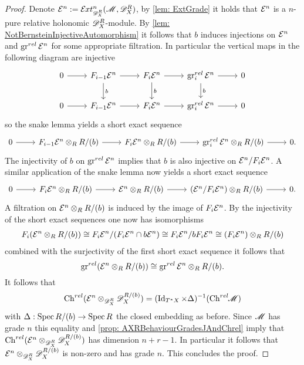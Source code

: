 \begin{proof}
  Denote $\E^n := \Ex{\D_X^R}{n}(\M,\D_X^R)$, by \cref{lem: ExtGrade} it holds that $\mathcal{E}^n$ is a $n$-pure relative holonomic $\mathscr{D}_X^R$-module.
  By \cref{lem: NotBernsteinInjectiveAutomorphism} it follows that $b$ induces injections on $\mathcal{E}^{n}$ and $\operatorname{gr}^{rel} \mathcal{E}^{n}$ for some appropriate filtration.
  In particular the vertical maps in the following diagram are injective
  $$\begin{tikzcd}
    0 \arrow{r} & F_{i-1} \E^n\arrow{r} \arrow{d}{b}& F_i \E^{n}\arrow{r} \arrow{d}{b}& \gr^{rel}_i \E^n\arrow{r}\arrow{d}{b} & 0\\
    0 \arrow{r} & F_{i-1} \E^n\arrow{r} & F_i \E^{n}\arrow{r} & \gr^{rel}_i \E^n\arrow{r} & 0
  \end{tikzcd} $$
  so the snake lemma yields a short exact sequence
  $$\begin{tikzcd}
    0 \arrow{r} & F_{i-1} \E^n\otimes_R R/(b)\arrow{r} & F_i \E^{n}\otimes_R R/(b)\arrow{r} & \gr^{rel}_i \E^n\arrow{r}\otimes_R R/(b) & 0.
  \end{tikzcd} $$
  The injectivity of $b$ on $\operatorname{gr}^{rel}\mathcal{E}^n$ implies that $b$ is also injective on $\mathcal{E}^n/F_i\mathcal{E}^n$. A similar application of the snake lemma now yields a short exact sequence
  $$\begin{tikzcd}
    0 \arrow{r} & F_{i} \E^n\otimes_R R/(b)\arrow{r} & \E^{n}\otimes_R R/(b)\arrow{r} & (\E^n/F_i \E^n )\arrow{r}\otimes_R R/(b) & 0.
  \end{tikzcd} $$
  A filtration on $\mathcal{E}^n \otimes_R R/(b)$ is induced by the image of $F_i\mathcal{E}^n$. By the injectivity of the short exact sequences one now has isomorphisms
  \begin{align*}
    F_i(\mathcal{E}^n \otimes_R R/(b)) \cong F_i\mathcal{E}^n / (F_i \mathcal{E}^n \cap b\mathcal{E}^n) \cong F_i \mathcal{E}^n / b F_i \mathcal{E}^n \cong  (F_i\mathcal{E}^n) \otimes_R R/(b)
  \end{align*}
  combined with the surjectivity of the first short exact sequence it follows that
  $$\operatorname{gr}^{rel}(\mathcal{E}^n \otimes_R R/(b)) \cong \operatorname{gr}^{rel}\mathcal{E}^n \otimes_R R/(b). $$
  It follows that
  $$\operatorname{Ch}^{rel}(\mathcal{E}^n \otimes_{\mathscr{D}_X^R} \mathscr{D}_X^{R/(b)})  = (\operatorname{Id}_{T^*X} \times \Delta)^{-1}(\operatorname{Ch}^{rel}\mkern-5mu \mathscr{M})$$
  with $\Delta: \operatorname{Spec} R/(b) \to \operatorname{Spec} R$ the closed embedding as before.
  Since $\mathscr{M}$ has grade $n$ this equality and \cref{prop: AXRBehaviourGradesJAndChrel} imply that $\operatorname{Ch}^{rel}(\mathcal{E}^n \otimes_{\mathscr{D}_X^R} \mathscr{D}_X^{R/(b)})$ has dimension $n + r - 1$.
  In particular it follows that $\mathcal{E}^n \otimes_{\mathscr{D}_X^R} \mathscr{D}_X^{R/(b)}$ is non-zero and has grade $n$. This concludes the proof.
\end{proof}
